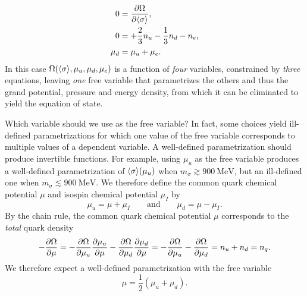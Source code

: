 \begin{subequations}
\begin{align}
	0 &= \pdv{\Omega}{ \langle \sigma \rangle} , \label{eq:lsm:minsys_min} \\
	0 &= +\frac23 n_u - \frac13 n_d - n_e , \label{eq:lsm:minsys_charge} \\
	\mu_d &= \mu_u + \mu_e . \label{eq:lsm:minsys_equilibrium}
\end{align}%
\label{eq:lsm:minsys}%
\end{subequations}%
In this case $\Omega(\langle \sigma \rangle,\mu_u,\mu_d,\mu_e)$ is a function of \emph{four} variables,
constrained by \emph{three} equations,
leaving \emph{one} free variable that parametrizes the others and thus the grand potential, pressure and energy density,
from which it can be eliminated to yield the equation of state.

Which variable should we use as the free variable?
In fact, some choices yield ill-defined parametrizations for which one value of the free variable corresponds to multiple values of a dependent variable.
A well-defined parametrization should produce invertible functions.
For example, using $\mu_u$ as the free variable produces a well-defined parametrization of $\langle \sigma \rangle(\mu_u)$ when $m_\sigma \gtrsim \SI{900}{\mega\electronvolt}$, but an ill-defined one when $m_\sigma \lesssim \SI{900}{\mega\electronvolt}$.
We therefore define the common quark chemical potential $\mu$ and isospin chemical potential $\mu_I$ by
\begin{equation}
	\mu_u = \mu + \mu_I
	\qquad \text{and} \qquad
	\mu_d = \mu - \mu_I .
\label{eq:lsm:quark_chemical_potential}
\end{equation}
By the chain rule, the common quark chemical potential $\mu$ corresponds to the \emph{total} quark density
\begin{equation}
	-\pdv{\Omega}{\mu} = -\pdv{\Omega}{\mu_u} \pdv{\mu_u}{\mu} - \pdv{\Omega}{\mu_d} \pdv{\mu_d}{\mu} = -\pdv{\Omega}{\mu_u} - \pdv{\Omega}{\mu_d} = n_u + n_d = n_q .
\end{equation}
We therefore expect a well-defined parametrization with the free variable
\begin{equation}
	\mu = \frac12 (\mu_u + \mu_d).
\end{equation}

